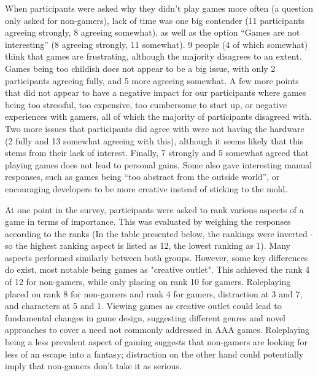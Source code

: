 \documentclass[]{vutinfth}
\begin{document}
When participants were asked why they didn't play games more often (a
question only asked for non-gamers), lack of time was one big contender
(11 participants agreeing strongly, 8 agreeing somewhat), as well as the
option ``Games are not interesting'' (8 agreeing strongly, 11 somewhat).
9 people (4 of which somewhat) think that games are frustrating,
although the majority disagrees to an extent. Games being too childish
does not appear to be a big issue, with only 2 participants agreeing
fully, and 5 more agreeing somewhat. A few more points that did not
appear to have a negative impact for our participants where games being
too stressful, too expensive, too cumbersome to start up, or negative
experiences with gamers, all of which the majority of participants
disagreed with. Two more issues that participants did agree with were
not having the hardware (2 fully and 13 somewhat agreeing with this),
although it seems likely that this stems from their lack of interest.
Finally, 7 strongly and 5 somewhat agreed that playing games does not
lead to personal gains. Some also gave interesting manual responses,
such as games being ``too abstract from the outside world'', or
encouraging developers to be more creative instead of sticking to the
mold.

At one point in the survey, participants were asked to rank various
aspects of a game in terms of importance. This was evaluated by weighing
the responses according to the ranks (In the table presented below, the
rankings were inverted - so the highest ranking aspect is listed as 12,
the lowest ranking as 1). Many aspects performed similarly between both
groups. However, some key differences do exist, most notable being games
as "creative outlet". This achieved the rank 4 of 12 for non-gamers,
while only placing on rank 10 for gamers. Roleplaying placed on rank 8
for non-gamers and rank 4 for gamers, distraction at 3 and 7, and
characters at 5 and 1. Viewing games as creative outlet could lead to
fundamental changes in game design, suggesting different genres and
novel approaches to cover a need not commonly addressed in AAA games.
Roleplaying being a less prevalent aspect of gaming suggests that
non-gamers are looking for less of an escape into a fantasy; distraction
on the other hand could potentially imply that non-gamers don't take it
as serious.
\end{document}
